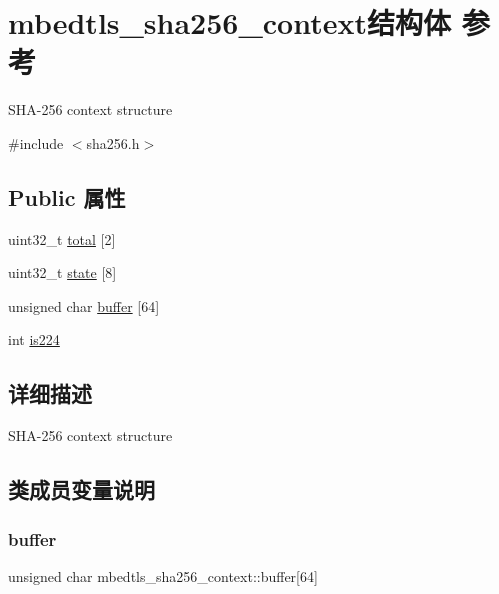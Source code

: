\hypertarget{structmbedtls__sha256__context}{}\section{mbedtls\+\_\+sha256\+\_\+context结构体 参考}
\label{structmbedtls__sha256__context}


S\+H\+A-\/256 context structure  




{\ttfamily \#include $<$sha256.\+h$>$}

\subsection*{Public 属性}
\begin{DoxyCompactItemize}
\item 
uint32\+\_\+t \hyperlink{structmbedtls__sha256__context_ab7444610a95153450180924862b2a0fa}{total} \mbox{[}2\mbox{]}
\item 
uint32\+\_\+t \hyperlink{structmbedtls__sha256__context_a88df25a0934134bd8b686152ba763322}{state} \mbox{[}8\mbox{]}
\item 
unsigned char \hyperlink{structmbedtls__sha256__context_adb4c87a904e9d4099592c5bf7ff0b308}{buffer} \mbox{[}64\mbox{]}
\item 
int \hyperlink{structmbedtls__sha256__context_ac73158ffb252c4bd2ccb991653619cc1}{is224}
\end{DoxyCompactItemize}


\subsection{详细描述}
S\+H\+A-\/256 context structure 

\subsection{类成员变量说明}
\mbox{\label{structmbedtls__sha256__context_adb4c87a904e9d4099592c5bf7ff0b308}} 
\subsubsection{\texorpdfstring{buffer}{buffer}}
{\footnotesize\ttfamily unsigned char mbedtls\+\_\+sha256\+\_\+context\+::buffer\mbox{[}64\mbox{]}}

